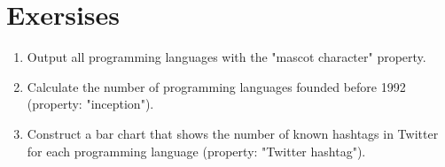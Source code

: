 \section{Exersises}
\begin{enumerate}
\item Output all programming languages with the "mascot character" property.
\item Calculate the number of programming languages founded before 1992 (property: "inception").
\item Construct a bar chart that shows the number of known hashtags in Twitter for each programming language (property: "Twitter hashtag").
\end{enumerate}